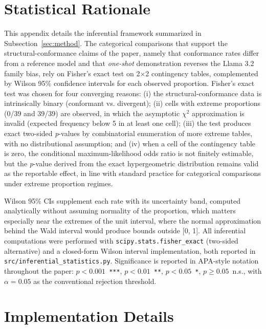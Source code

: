 \documentclass{sbc2023}%
\begin{document}
\appendix

\section{Statistical Rationale}
\label{app:stats}

This appendix details the inferential framework summarized in Subsection~\ref{sec:method}. The categorical comparisons that support the structural-conformance claims of the paper, namely that conformance rates differ from a reference model and that \textit{one-shot} demonstration reverses the Llama 3.2 family bias, rely on Fisher's exact test on 2$\times$2 contingency tables, complemented by Wilson 95\% confidence intervals for each observed proportion. Fisher's exact test was chosen for four converging reasons: (i) the structural-conformance data is intrinsically binary (conformant vs. divergent); (ii) cells with extreme proportions (0/39 and 39/39) are observed, in which the asymptotic $\chi^2$ approximation is invalid (expected frequency below 5 in at least one cell); (iii) the test produces exact two-sided \textit{p}-values by combinatorial enumeration of more extreme tables, with no distributional assumption; and (iv) when a cell of the contingency table is zero, the conditional maximum-likelihood odds ratio is not finitely estimable, but the \textit{p}-value derived from the exact hypergeometric distribution remains valid as the reportable effect, in line with standard practice for categorical comparisons under extreme proportion regimes.

Wilson 95\% CIs supplement each rate with its uncertainty band, computed analytically without assuming normality of the proportion, which matters especially near the extremes of the unit interval, where the normal approximation behind the Wald interval would produce bounds outside [0, 1]. All inferential computations were performed with \texttt{scipy.stats.fisher\_exact} (two-sided alternative) and a closed-form Wilson interval implementation, both reported in \texttt{src/inferential\_statistics.py}. Significance is reported in APA-style notation throughout the paper: $p<0.001$~\texttt{***}, $p<0.01$~\texttt{**}, $p<0.05$~\texttt{*}, $p\geq 0.05$~n.s., with $\alpha=0.05$ as the conventional rejection threshold.

\section{Implementation Details}
\label{app:impl}
\end{document}
